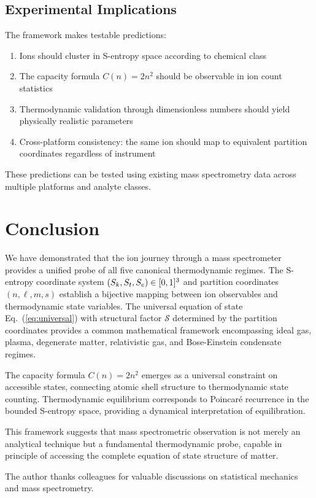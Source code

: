 \subsection{Experimental Implications}

The framework makes testable predictions:
\begin{enumerate}
    \item Ions should cluster in S-entropy space according to chemical class
    \item The capacity formula $C(n) = 2n^2$ should be observable in ion count statistics
    \item Thermodynamic validation through dimensionless numbers should yield physically realistic parameters
    \item Cross-platform consistency: the same ion should map to equivalent partition coordinates regardless of instrument
\end{enumerate}

These predictions can be tested using existing mass spectrometry data across multiple platforms and analyte classes.

\section{Conclusion}

We have demonstrated that the ion journey through a mass spectrometer provides a unified probe of all five canonical thermodynamic regimes. The S-entropy coordinate system $(S_k, S_t, S_e) \in [0,1]^3$ and partition coordinates $(n, \ell, m, s)$ establish a bijective mapping between ion observables and thermodynamic state variables. The universal equation of state Eq.~(\ref{eq:universal}) with structural factor $\mathcal{S}$ determined by the partition coordinates provides a common mathematical framework encompassing ideal gas, plasma, degenerate matter, relativistic gas, and Bose-Einstein condensate regimes.

The capacity formula $C(n) = 2n^2$ emerges as a universal constraint on accessible states, connecting atomic shell structure to thermodynamic state counting. Thermodynamic equilibrium corresponds to Poincar\'{e} recurrence in the bounded S-entropy space, providing a dynamical interpretation of equilibration.

This framework suggests that mass spectrometric observation is not merely an analytical technique but a fundamental thermodynamic probe, capable in principle of accessing the complete equation of state structure of matter.

\begin{acknowledgments}
The author thanks colleagues for valuable discussions on statistical mechanics and mass spectrometry.
\end{acknowledgments}


